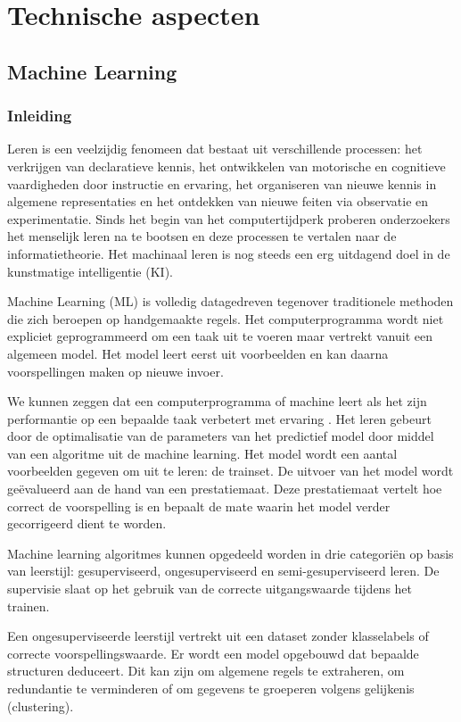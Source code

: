 \chapter{Technische aspecten}
\section{Machine Learning}
\subsection{Inleiding}
\npar Leren is een veelzijdig fenomeen dat bestaat uit  verschillende processen: het verkrijgen van declaratieve kennis, het ontwikkelen van motorische en cognitieve vaardigheden door instructie en ervaring, het organiseren van nieuwe kennis in algemene representaties en het ontdekken van nieuwe feiten via observatie en experimentatie.
\npar Sinds het begin van het computertijdperk proberen onderzoekers het menselijk leren na te bootsen en deze processen te vertalen naar de informatietheorie. Het machinaal leren is nog steeds een erg uitdagend doel in de kunstmatige intelligentie (KI).

\npar Machine Learning (ML) is volledig datagedreven tegenover traditionele methoden die zich beroepen op handgemaakte regels. Het computerprogramma wordt niet expliciet geprogrammeerd om een taak uit te voeren maar vertrekt vanuit een algemeen model. Het model leert eerst uit voorbeelden en kan daarna voorspellingen maken op nieuwe invoer.

\npar We kunnen zeggen dat een computerprogramma of machine leert als het zijn performantie op een bepaalde taak verbetert met ervaring \cite{machine_overview}.  Het leren gebeurt door de optimalisatie van de parameters van het predictief model door middel van een algoritme uit de machine learning. Het model wordt een aantal voorbeelden gegeven om uit te leren: de trainset. De uitvoer van het model wordt ge\"evalueerd aan de hand van een prestatiemaat. Deze prestatiemaat vertelt hoe correct de voorspelling is en bepaalt de mate waarin het model verder gecorrigeerd dient te worden.

\npar Machine learning algoritmes kunnen opgedeeld worden in drie categori\"en op basis van leerstijl: gesuperviseerd, ongesuperviseerd en semi-gesuperviseerd leren. De supervisie slaat op het gebruik van de correcte uitgangswaarde tijdens het trainen.

\npar Een ongesuperviseerde leerstijl vertrekt uit een dataset zonder klasselabels of correcte voorspellingswaarde. Er wordt een model opgebouwd dat bepaalde structuren deduceert. Dit kan zijn om algemene regels te extraheren, om redundantie te verminderen of om gegevens te groeperen volgens gelijkenis (clustering).

